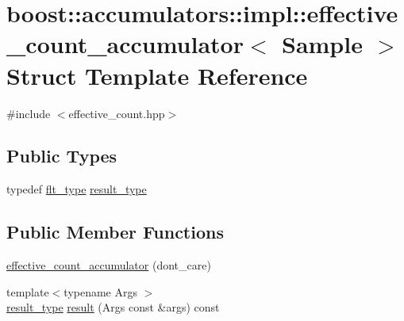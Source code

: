 \hypertarget{structboost_1_1accumulators_1_1impl_1_1effective__count__accumulator}{\section{boost\-:\-:accumulators\-:\-:impl\-:\-:effective\-\_\-count\-\_\-accumulator$<$ Sample $>$ Struct Template Reference}
\label{structboost_1_1accumulators_1_1impl_1_1effective__count__accumulator}
}


{\ttfamily \#include $<$effective\-\_\-count.\-hpp$>$}

\subsection*{Public Types}
\begin{DoxyCompactItemize}
\item 
typedef \hyperlink{lib_2IceBRG__main_2common_8h_ad0f130a56eeb944d9ef2692ee881ecc4}{flt\-\_\-type} \hyperlink{structboost_1_1accumulators_1_1impl_1_1effective__count__accumulator_a5516ab157ca383ec0cea01649c3d9879}{result\-\_\-type}
\end{DoxyCompactItemize}
\subsection*{Public Member Functions}
\begin{DoxyCompactItemize}
\item 
\hyperlink{structboost_1_1accumulators_1_1impl_1_1effective__count__accumulator_ae3d2dd9daf6faa19d0f6cdee64af6a47}{effective\-\_\-count\-\_\-accumulator} (dont\-\_\-care)
\item 
{\footnotesize template$<$typename Args $>$ }\\\hyperlink{structboost_1_1accumulators_1_1impl_1_1effective__count__accumulator_a5516ab157ca383ec0cea01649c3d9879}{result\-\_\-type} \hyperlink{structboost_1_1accumulators_1_1impl_1_1effective__count__accumulator_a136494d144b3456c4c30ae7ae562b99b}{result} (Args const \&args) const 
\end{DoxyCompactItemize}


